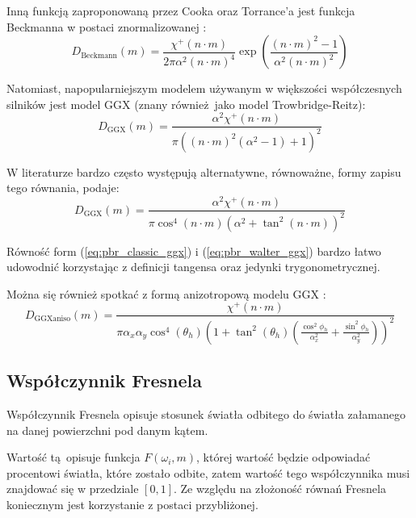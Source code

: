\documentclass[../main.tex]{subfiles}
\begin{document}
Inną funkcją zaproponowaną przez Cooka oraz Torrance'a jest funkcja Beckmanna \cite{CookTorrance} w postaci znormalizowanej \cite{pbr_background}:
\begin{equation}
  D_{\text{Beckmann}}(m) =
    \frac{\chi^{+}(n \cdot m)}{2\pi\alpha^2 (n \cdot m)^{4}}
    \exp\left(
      \frac{
        (n \cdot m)^2 - 1
      }{
        \alpha^2 (n \cdot m)^2
      }
    \right)
\end{equation}

Natomiast, napopularniejszym modelem używanym w większości współczesnych silników jest model GGX (znany również jako model Trowbridge-Reitz):
\begin{equation}
  D_{\text{GGX}}(m) =
    \frac{
      \alpha^2 \chi^{+}(n \cdot m)
    }{
      \pi \left(
        \left(n \cdot m \right)^{2}
        \left(\alpha^2 - 1 \right)
        + 1
      \right)^2
    }
\label{eq:pbr_classic_ggx}
\end{equation}

W literaturze bardzo często występują alternatywne, równoważne, formy zapisu
tego równania, \cite{WalterMicrofacetModels} podaje:
\begin{equation}
  D_{\text{GGX}}(m) =
    \frac{\alpha^2 \chi^{+}(n \cdot m)}{
      \pi \cos^{4} (n \cdot m) \left( \alpha^2 + \tan^2 (n \cdot m) \right)^2
    }
\label{eq:pbr_walter_ggx}
\end{equation}

\noindent Równość form (\ref{eq:pbr_classic_ggx}) i (\ref{eq:pbr_walter_ggx})  bardzo łatwo udowodnić korzystając z definicji tangensa oraz jedynki trygonometrycznej.

Można się również spotkać z formą anizotropową modelu GGX \cite{pbrt}:
\begin{equation}
  D_{\text{GGXaniso}}(m) =
    \frac{\chi^{+}(n \cdot m)}{
      \pi \alpha_x \alpha_y \cos^{4} (\theta_h) \left(
        1 + \tan^{2}(\theta_h) \left(
          \frac{\cos^{2}{\phi_h}}{\alpha_{x}^{2}} +
          \frac{\sin^{2}{\phi_h}}{\alpha_{y}^{2}}
        \right)
      \right)^{2}
    }
\end{equation}

\subsection{Współczynnik Fresnela}

Współczynnik Fresnela opisuje stosunek światła odbitego do światła załamanego
na danej powierzchni pod danym kątem.

Wartość tą opisuje funkcja $F(\omega_i,m)$, której wartość będzie odpowiadać
procentowi światła, które zostało odbite, zatem wartość tego współczynnika musi
znajdować się w przedziale $[0,1]$. Ze względu na złożoność równań Fresnela
koniecznym jest korzystanie z postaci przybliżonej. 
\end{document}
